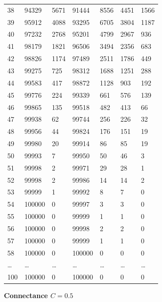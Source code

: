 \documentclass[]{article}
\begin{document}
\begin{longtable}[]{@{}lllllll@{}}
38 & 94329 & 5671 & 91444 & 8556 & 4451 & 1566\tabularnewline
39 & 95912 & 4088 & 93295 & 6705 & 3804 & 1187\tabularnewline
40 & 97232 & 2768 & 95201 & 4799 & 2967 & 936\tabularnewline
41 & 98179 & 1821 & 96506 & 3494 & 2356 & 683\tabularnewline
42 & 98826 & 1174 & 97489 & 2511 & 1786 & 449\tabularnewline
43 & 99275 & 725 & 98312 & 1688 & 1251 & 288\tabularnewline
44 & 99583 & 417 & 98872 & 1128 & 903 & 192\tabularnewline
45 & 99776 & 224 & 99339 & 661 & 576 & 139\tabularnewline
46 & 99865 & 135 & 99518 & 482 & 413 & 66\tabularnewline
47 & 99938 & 62 & 99744 & 256 & 226 & 32\tabularnewline
48 & 99956 & 44 & 99824 & 176 & 151 & 19\tabularnewline
49 & 99980 & 20 & 99914 & 86 & 85 & 19\tabularnewline
50 & 99993 & 7 & 99950 & 50 & 46 & 3\tabularnewline
51 & 99998 & 2 & 99971 & 29 & 28 & 1\tabularnewline
52 & 99998 & 2 & 99986 & 14 & 14 & 2\tabularnewline
53 & 99999 & 1 & 99992 & 8 & 7 & 0\tabularnewline
54 & 100000 & 0 & 99997 & 3 & 3 & 0\tabularnewline
55 & 100000 & 0 & 99999 & 1 & 1 & 0\tabularnewline
56 & 100000 & 0 & 99998 & 2 & 2 & 0\tabularnewline
57 & 100000 & 0 & 99999 & 1 & 1 & 0\tabularnewline
58 & 100000 & 0 & 100000 & 0 & 0 & 0\tabularnewline
\ldots{} & \ldots{} & \ldots{} & \ldots{} & \ldots{} & \ldots{} &
\ldots{}\tabularnewline
100 & 100000 & 0 & 100000 & 0 & 0 & 0\tabularnewline
\bottomrule
\end{longtable}

\textbf{Connectance \(C = 0.5\)}
\end{document}

